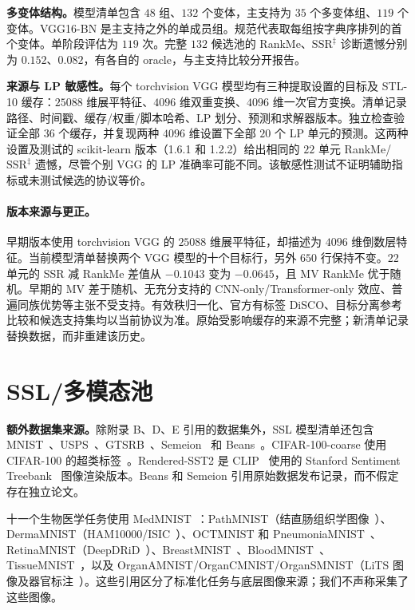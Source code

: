 \documentclass{article}
\newcommand{\SSRdag}{\ensuremath{\mathrm{SSR}^{\ddagger}}\xspace}
\begin{document}
\textbf{多变体结构。}模型清单包含 $48$ 组、$132$ 个变体，主支持为 $35$ 个多变体组、$119$ 个变体。VGG16-BN 是主支持之外的单成员组。规范代表取每组按字典序排列的首个变体。单阶段评估为 $119$ 次。完整 $132$ 候选池的 RankMe、\SSRdag 诊断遗憾分别为 $0.152$、$0.082$，有各自的 oracle，与主支持比较分开报告。

\textbf{来源与 LP 敏感性。}每个 torchvision VGG 模型均有三种提取设置的目标及 STL-10 缓存：$25088$ 维展平特征、$4096$ 维双重变换、$4096$ 维一次官方变换。清单记录路径、时间戳、缓存/权重/脚本哈希、LP 划分、预测和求解器版本。独立检查验证全部 $36$ 个缓存，并复现两种 $4096$ 维设置下全部 $20$ 个 LP 单元的预测。这两种设置及测试的 scikit-learn 版本（1.6.1 和 1.2.2）给出相同的 $22$ 单元 RankMe/\SSRdag 遗憾，尽管个别 VGG 的 LP 准确率可能不同。该敏感性测试不证明辅助指标或未测试候选的协议等价。

\paragraph{版本来源与更正。}
早期版本使用 torchvision VGG 的 $25088$ 维展平特征，却描述为 $4096$ 维倒数层特征。当前模型清单替换两个 VGG 模型的十个目标行，另外 $650$ 行保持不变。$22$ 单元的 SSR 减 RankMe 差值从 $-0.1043$ 变为 $-0.0645$，且 MV RankMe 优于随机。早期的 MV 差于随机、无充分支持的 CNN-only/Transformer-only 效应、普遍同族优势等主张不受支持。有效秩归一化、官方有标签 DiSCO、目标分离参考比较和候选支持集均以当前协议为准。原始受影响缓存的来源不完整；新清单记录替换数据，而非重建该历史。

\section{SSL/多模态池}
\textbf{额外数据集来源。}除附录 B、D、E 引用的数据集外，SSL 模型清单还包含 MNIST~\citep{lecun1998mnist}、USPS~\citep{hull1994usps}、GTSRB~\citep{stallkamp2011gtsrb}、Semeion~\citep{semeion1998digits} 和 Beans~\citep{makererebeans}。CIFAR-100-coarse 使用 CIFAR-100 的超类标签~\citep{krizhevsky2009cifar}。Rendered-SST2 是 CLIP~\citep{radford2021clip} 使用的 Stanford Sentiment Treebank~\citep{socher2013sst} 图像渲染版本。Beans 和 Semeion 引用原始数据发布记录，而不假定存在独立论文。

十一个生物医学任务使用 MedMNIST~\citep{yang2023medmnist}：PathMNIST（结直肠组织学图像~\citep{kather2019path}）、DermaMNIST（HAM10000/ISIC~\citep{tschandl2018ham,codella2019isic}）、OCTMNIST 和 PneumoniaMNIST~\citep{kermany2018medical}、RetinaMNIST（DeepDRiD~\citep{liu2022deepdrid}）、BreastMNIST~\citep{aldhabyani2020breast}、BloodMNIST~\citep{acevedo2020blood}、TissueMNIST~\citep{ljosa2012tissue}，以及 OrganAMNIST/OrganCMNIST/OrganSMNIST（LiTS 图像及器官标注~\citep{bilic2019lits,xu2019organs}）。这些引用区分了标准化任务与底层图像来源；我们不声称采集了这些图像。
\end{document}
